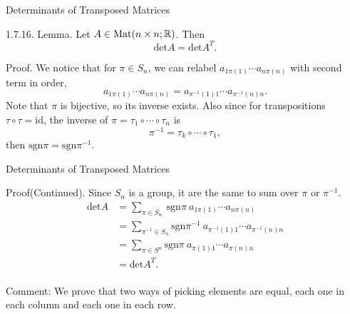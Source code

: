 \documentclass[hyperref={pdfpagelabels=true}]{beamer}
\newcommand{\Mat}{\text{Mat}}
\newcommand{\<}{\langle}
\renewcommand{\>}{\rangle}
\begin{document}
    \begin{frame}{Determinants of Transposed Matrices}
        \begin{block}{1.7.16. Lemma.}
            Let $A \in \Mat(n \times n;\R)$. Then
            \[\text{det}A = \text{det}A^{T}.\]
        \end{block}
        \begin{block}{Proof.}
            We notice that for $\pi \in S_{n}$, we can relabel $a_{1\pi(1)} \cdots a_{n\pi(n)}$ with second term in order,
            \[a_{1\pi(1)} \cdots a_{n\pi(n)} = a_{\pi^{-1}(1)1} \cdots a_{\pi^{-1}(n)n}.\]
            Note that $\pi$ is bijective, so its inverse exists. Also since for transpositions $\tau \circ \tau = \text{id}$, the inverse of $\pi = \tau_{1} \circ \cdots \circ \tau_{n}$ is 
            \[\pi^{-1} = \tau_{k} \circ \cdots \circ \tau_{1},\]
            then $\text{sgn}\pi = \text{sgn}\pi^{-1}$. 
        \end{block}
    \end{frame}
    \begin{frame}{Determinants of Transposed Matrices}
        \begin{block}{Proof(Continued).}
            Since $S_{n}$ is a group, it are the same to sum over $\pi$ or $\pi^{-1}$.
            \[
                \begin{aligned}
                    \text{det}A &= \sum_{\pi \in S_{n}}\ \text{sgn}\pi\ a_{1\pi(1)} \cdots a_{n\pi(n)} \\
                    &= \sum_{\pi^{-1} \in S_{n}}\text{sgn}\pi^{-1}\ a_{\pi^{-1}(1)1} \cdots a_{\pi^{-1}(n)n}\\
                    &= \sum_{\pi \in S^{n}} \text{sgn}\pi\ a_{\pi(1)1} \cdots a_{\pi(n)n}\\
                    &= \text{det}A^{T}.\\
                \end{aligned}
            \]
        \end{block}
        \begin{block}{Comment:}
            We prove that two ways of picking elements are equal, each one in each column and each one in each row.
        \end{block}
    \end{frame}
\end{document}
